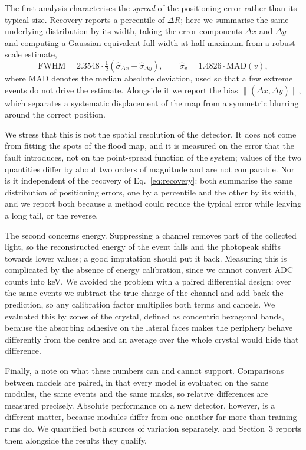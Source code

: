 \documentclass[10pt,conference]{IEEEtran}
\begin{document}
The first analysis characterises the \emph{spread} of the positioning error
rather than its typical size. Recovery reports a percentile of $\Delta R$; here
we summarise the same underlying distribution by its width, taking the error
components $\Delta x$ and $\Delta y$ and computing a Gaussian-equivalent full
width at half maximum from a robust scale estimate,
%
\begin{equation}
\mathrm{FWHM} = 2.3548 \cdot \tfrac{1}{2}
  \left( \hat{\sigma}_{\Delta x} + \hat{\sigma}_{\Delta y} \right),
\qquad
\hat{\sigma}_{v} = 1.4826 \cdot \mathrm{MAD}(v),
\label{eq:fwhm}
\end{equation}
%
where MAD denotes the median absolute deviation, used so that a few extreme
events do not drive the estimate. Alongside it we report the bias
$\lVert(\overline{\Delta x}, \overline{\Delta y})\rVert$, which separates a
systematic displacement of the map from a symmetric blurring around the correct
position.

We stress that this is not the spatial resolution of the detector. It does not
come from fitting the spots of the flood map, and it is measured on the error
that the fault introduces, not on the point-spread function of the system;
values of the two quantities differ by about two orders of magnitude and are
not comparable. Nor is it independent of the recovery of
Eq.~\ref{eq:recovery}: both summarise the same distribution of positioning
errors, one by a percentile and the other by its width, and we report both
because a method could reduce the typical error while leaving a long tail, or
the reverse.

The second concerns energy. Suppressing a channel removes part of the collected
light, so the reconstructed energy of the event falls and the photopeak shifts
towards lower values; a good imputation should put it back. Measuring this is
complicated by the absence of energy calibration, since we cannot convert
ADC counts into keV. We avoided the problem with a paired differential design:
over the same events we subtract the true charge of the channel and add back
the prediction, so any calibration factor multiplies both terms and cancels.
We evaluated this by zones of the crystal, defined as concentric hexagonal
bands, because the absorbing adhesive on the lateral faces makes the periphery
behave differently from the centre \cite{conde_minimization_2014} and an
average over the whole crystal would hide that difference.

Finally, a note on what these numbers can and cannot support. Comparisons
between models are paired, in that every model is evaluated on the same
modules, the same events and the same masks, so relative differences are
measured precisely. Absolute performance on a new detector, however, is a
different matter, because modules differ from one another far more than
training runs do.
We quantified both sources of variation separately, and Section~3 reports them
alongside the results they qualify.
\end{document}
